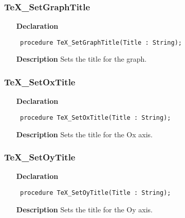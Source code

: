 \documentclass[12pt,a4paper,oneside]{report}
\newcommand{\declarationitem}[1]{\textbf{#1}}
\newcommand{\descriptiontitle}[1]{\textbf{#1}}
\newcommand{\code}[1]{\texttt{#1}}
\begin{document}
\subsubsection{TeX{\_}SetGraphTitle}
\label{utexplot-TeX_SetGraphTitle}
\begin{itemize}\item[\declarationitem{Declaration}\hfill]
	\begin{flushleft}
		\code{
			procedure TeX{\_}SetGraphTitle(Title : String);}
		
	\end{flushleft}
	
	\par
	\item[\descriptiontitle{Description}]
	Sets the title for the graph.
	
\end{itemize}
\subsubsection{TeX{\_}SetOxTitle}
\label{utexplot-TeX_SetOxTitle}
\begin{itemize}\item[\declarationitem{Declaration}\hfill]
	\begin{flushleft}
		\code{
			procedure TeX{\_}SetOxTitle(Title : String);}
		
	\end{flushleft}
	
	\par
	\item[\descriptiontitle{Description}]
	Sets the title for the Ox axis.
	
\end{itemize}
\subsubsection{TeX{\_}SetOyTitle}
\label{utexplot-TeX_SetOyTitle}
\begin{itemize}\item[\declarationitem{Declaration}\hfill]
	\begin{flushleft}
		\code{
			procedure TeX{\_}SetOyTitle(Title : String);}
		
	\end{flushleft}
	
	\par
	\item[\descriptiontitle{Description}]
	Sets the title for the Oy axis.
	
\end{itemize}
\end{document}

